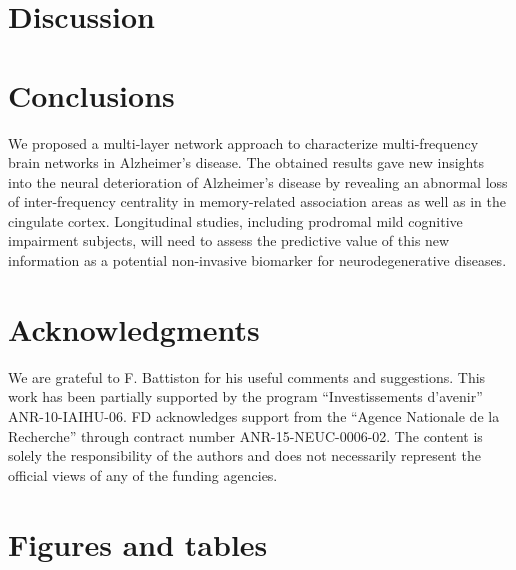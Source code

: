 \documentclass[1p]{elsarticle}
\begin{document}
\section{Discussion} \label{sec:discussion}



\section{Conclusions}

We proposed a multi-layer network approach to characterize multi-frequency brain networks in Alzheimer's disease.
The obtained results gave new insights into the neural deterioration of Alzheimer's disease by revealing an abnormal loss of inter-frequency centrality in memory-related association areas as well as in the cingulate cortex.
Longitudinal studies, including prodromal mild cognitive impairment subjects, will need to assess the predictive value of this new information as a potential non-invasive biomarker for neurodegenerative diseases.

\section*{Acknowledgments}

We are grateful to F. Battiston for his useful comments and suggestions. This work has been partially supported by the program ``Investissements d'avenir'' ANR-10-IAIHU-06. FD acknowledges support from the ``Agence Nationale de la Recherche'' through contract number ANR-15-NEUC-0006-02.
The content is solely the responsibility of the authors and does not necessarily represent the official views of any of the funding agencies.






\newpage
\section*{Figures and tables}
\end{document}
